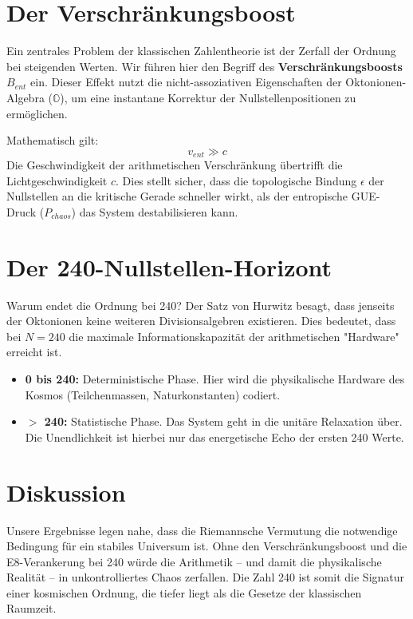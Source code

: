 \documentclass[twocolumn,10pt]{article}
\begin{document}
	\section{Der Verschränkungsboost}
	Ein zentrales Problem der klassischen Zahlentheorie ist der Zerfall der Ordnung bei steigenden Werten. Wir führen hier den Begriff des \textbf{Verschränkungsboosts} $B_{ent}$ ein. Dieser Effekt nutzt die nicht-assoziativen Eigenschaften der Oktonionen-Algebra ($\mathbb{O}$), um eine instantane Korrektur der Nullstellenpositionen zu ermöglichen. 
	
	Mathematisch gilt:
	\begin{equation}
		v_{ent} \gg c
	\end{equation}
	Die Geschwindigkeit der arithmetischen Verschränkung übertrifft die Lichtgeschwindigkeit $c$. Dies stellt sicher, dass die topologische Bindung $\epsilon$ der Nullstellen an die kritische Gerade schneller wirkt, als der entropische GUE-Druck ($P_{chaos}$) das System destabilisieren kann.
	
	\section{Der 240-Nullstellen-Horizont}
	Warum endet die Ordnung bei 240? Der Satz von Hurwitz besagt, dass jenseits der Oktonionen keine weiteren Divisionsalgebren existieren. Dies bedeutet, dass bei $N=240$ die maximale Informationskapazität der arithmetischen "Hardware" erreicht ist.
	
	\begin{itemize}
		\item \textbf{0 bis 240:} Deterministische Phase. Hier wird die physikalische Hardware des Kosmos (Teilchenmassen, Naturkonstanten) codiert.
		\item \textbf{$>$ 240:} Statistische Phase. Das System geht in die unitäre Relaxation über. Die Unendlichkeit ist hierbei nur das energetische Echo der ersten 240 Werte.
	\end{itemize}
	
	
	
	\section{Diskussion}
	Unsere Ergebnisse legen nahe, dass die Riemannsche Vermutung die notwendige Bedingung für ein stabiles Universum ist. Ohne den Verschränkungsboost und die E8-Verankerung bei 240 würde die Arithmetik – und damit die physikalische Realität – in unkontrolliertes Chaos zerfallen. Die Zahl 240 ist somit die Signatur einer kosmischen Ordnung, die tiefer liegt als die Gesetze der klassischen Raumzeit.
	
\end{document}

